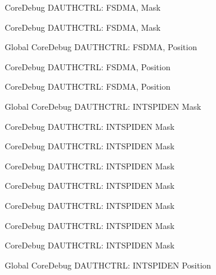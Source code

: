 \begin{DoxyRefList}
\label{deprecated__deprecated000084}%
%
Core\+Debug DAUTHCTRL\+: FSDMA, Mask 

\label{deprecated__deprecated000535}%
%
Core\+Debug DAUTHCTRL\+: FSDMA, Mask  
\item[Global \doxylink{group___c_m_s_i_s___s_c_b_ga2b4fde73cbbbb0adeb686dc20ff705de}{Core\+Debug\+\_\+\+DAUTHCTRL\+\_\+\+FSDMA\+\_\+\+Pos} ]\label{deprecated__deprecated000636}%
%
Core\+Debug DAUTHCTRL\+: FSDMA, Position 

\label{deprecated__deprecated000083}%
%
Core\+Debug DAUTHCTRL\+: FSDMA, Position 

\label{deprecated__deprecated000534}%
%
Core\+Debug DAUTHCTRL\+: FSDMA, Position  
\item[Global \doxylink{group___c_m_s_i_s___s_c_b_ga1570f149a0f89f70fc2644a5842cbcb4}{Core\+Debug\+\_\+\+DAUTHCTRL\+\_\+\+INTSPIDEN\+\_\+\+Msk} ]\label{deprecated__deprecated000144}%
%
Core\+Debug DAUTHCTRL\+: INTSPIDEN Mask 

\label{deprecated__deprecated000220}%
%
Core\+Debug DAUTHCTRL\+: INTSPIDEN Mask 

\label{deprecated__deprecated000438}%
%
Core\+Debug DAUTHCTRL\+: INTSPIDEN Mask 

\label{deprecated__deprecated000643}%
%
Core\+Debug DAUTHCTRL\+: INTSPIDEN Mask 

\label{deprecated__deprecated000541}%
%
Core\+Debug DAUTHCTRL\+: INTSPIDEN Mask 

\label{deprecated__deprecated000283}%
%
Core\+Debug DAUTHCTRL\+: INTSPIDEN Mask 

\label{deprecated__deprecated000090}%
%
Core\+Debug DAUTHCTRL\+: INTSPIDEN Mask 

\label{deprecated__deprecated000362}%
%
Core\+Debug DAUTHCTRL\+: INTSPIDEN Mask  
\item[Global \doxylink{group___c_m_s_i_s___s_c_b_ga3caef9790e4e2ccbfea77d55315ad59f}{Core\+Debug\+\_\+\+DAUTHCTRL\+\_\+\+INTSPIDEN\+\_\+\+Pos} ]\label{deprecated__deprecated000437}%
%
Core\+Debug DAUTHCTRL\+: INTSPIDEN Position 


\end{DoxyRefList}
